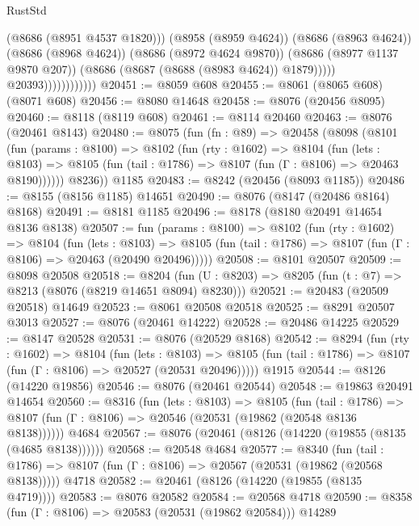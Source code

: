 \begin{lexlean}{RustStd}
\begin{coremodule}
                                    (@8686 (@8951 @4537 @1820)))
                                  (@8958 (@8959 @4624))
                                  (@8686 (@8963 @4624))
                                  (@8686 (@8968 @4624))
                                  (@8686 (@8972 @4624 @9870))
                                  (@8686 (@8977 @1137 @9870 @207))
                                  (@8686 (@8687 (@8688 (@8983 @4624)) @1879)))))
                            @20393))))))))))))
@20451 := @8059 @608
@20455 := @8061 (@8065 @608) (@8071 @608)
@20456 := @8080 @14648
@20458 := @8076 (@20456 @8095)
@20460 := @8118 (@8119 @608)
@20461 := @8114 @20460
@20463 := @8076 (@20461 @8143)
@20480 := @8075
    (fun (fn : @89) =>
    @20458
      (@8098
        (@8101
          (fun (params : @8100) =>
          @8102
            (fun (rty : @1602) =>
            @8104
              (fun (lets : @8103) =>
              @8105 (fun (tail : @1786) => @8107 (fun (Γ : @8106) => @20463 @8190))))))
        @8236))
    @1185
@20483 := @8242 (@20456 (@8093 @1185))
@20486 := @8155 (@8156 @1185) @14651
@20490 := @8076 (@8147 (@20486 @8164) @8168)
@20491 := @8181 @1185
@20496 := @8178 (@8180 @20491 @14654 @8136 @8138)
@20507 := fun (params : @8100) =>
  @8102
    (fun (rty : @1602) =>
    @8104
      (fun (lets : @8103) =>
      @8105 (fun (tail : @1786) => @8107 (fun (Γ : @8106) => @20463 (@20490 @20496)))))
@20508 := @8101 @20507
@20509 := @8098 @20508
@20518 := @8204
    (fun (U : @8203) => @8205 (fun (t : @7) => @8213 (@8076 (@8219 @14651 @8094) @8230)))
@20521 := @20483 (@20509 @20518) @14649
@20523 := @8061 @20508 @20518
@20525 := @8291 @20507 @3013
@20527 := @8076 (@20461 @14222)
@20528 := @20486 @14225
@20529 := @8147 @20528
@20531 := @8076 (@20529 @8168)
@20542 := @8294
    (fun (rty : @1602) =>
    @8104
      (fun (lets : @8103) =>
      @8105 (fun (tail : @1786) => @8107 (fun (Γ : @8106) => @20527 (@20531 @20496)))))
    @1915
@20544 := @8126 (@14220 @19856)
@20546 := @8076 (@20461 @20544)
@20548 := @19863 @20491 @14654
@20560 := @8316
    (fun (lets : @8103) =>
    @8105
      (fun (tail : @1786) =>
      @8107 (fun (Γ : @8106) => @20546 (@20531 (@19862 (@20548 @8136 @8138))))))
    @4684
@20567 := @8076 (@20461 (@8126 (@14220 (@19855 (@8135 (@4685 @8138))))))
@20568 := @20548 @4684
@20577 := @8340
    (fun (tail : @1786) => @8107 (fun (Γ : @8106) => @20567 (@20531 (@19862 (@20568 @8138)))))
    @4718
@20582 := @20461 (@8126 (@14220 (@19855 (@8135 @4719))))
@20583 := @8076 @20582
@20584 := @20568 @4718
@20590 := @8358 (fun (Γ : @8106) => @20583 (@20531 (@19862 @20584))) @14289

\end{coremodule}
\end{lexlean}
